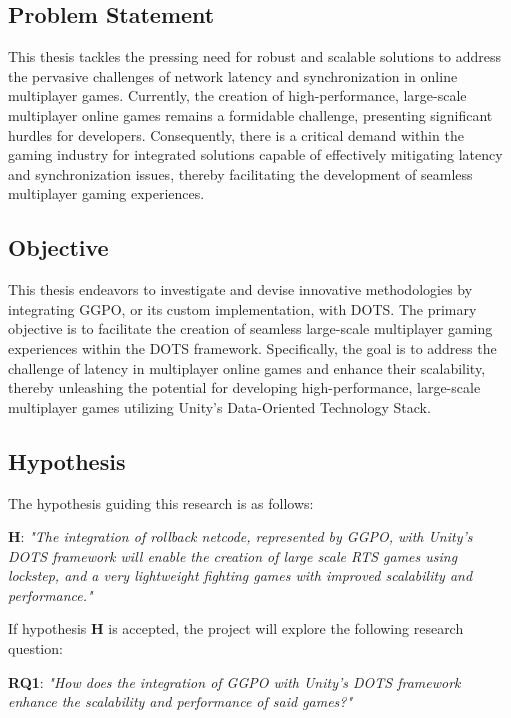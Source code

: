 \subsection{Problem Statement}

This thesis tackles the pressing need for robust and scalable solutions to address the pervasive challenges of network latency and synchronization in online multiplayer games. Currently, the creation of high-performance, large-scale multiplayer online games remains a formidable challenge, presenting significant hurdles for developers. Consequently, there is a critical demand within the gaming industry for integrated solutions capable of effectively mitigating latency and synchronization issues, thereby facilitating the development of seamless multiplayer gaming experiences.

\subsection{Objective}

This thesis endeavors to investigate and devise innovative methodologies by integrating GGPO, or its custom implementation, with DOTS. The primary objective is to facilitate the creation of seamless large-scale multiplayer gaming experiences within the DOTS framework. Specifically, the goal is to address the challenge of latency in multiplayer online games and enhance their scalability, thereby unleashing the potential for developing high-performance, large-scale multiplayer games utilizing Unity's Data-Oriented Technology Stack.

\subsection{Hypothesis} %

The hypothesis guiding this research is as follows:

\textbf{H}: \textit{"The integration of rollback netcode, represented by GGPO, with Unity's DOTS framework will enable the creation of large scale RTS games using lockstep, and a very lightweight fighting games with improved scalability and performance."}\newline

If hypothesis \textbf{H} is accepted, the project will explore the following research question:

\textbf{RQ1}: \textit{"How does the integration of GGPO with Unity's DOTS framework enhance the scalability and performance of said games?"}\newline

